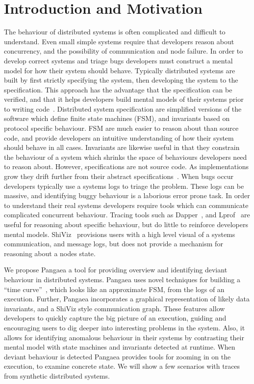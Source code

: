 \section{Introduction and Motivation}
\label{sec:intro}

The behaviour of distributed systems is often complicated and
difficult to understand. Even small simple systems require that
developers reason about concurrency, and the possibility of
communication and node failure. In order to develop correct systems
and triage bugs developers must construct a mental model for how
their system should behave. Typically distributed systems are built by
first strictly specifying the system, then developing the system to the
specification. This approach has the advantage that the specification
can be verified, and that it helps developers build mental models of
their systems prior to writing
code~\cite{Newcombe:2015:AWS:2749359.2699417,WilcoxWPTWEA2015}.
Distributed system specification are simplified versions of the
software which define finite state machines (FSM), and invariants
based on protocol specific behaviour. FSM are much easier to reason
about than source code, and provide developers an intuitive
understanding of how their system should behave in all cases.
Invariants are likewise useful in that they constrain the behaviour of
a system which shrinks the space of behaviours developers need to
reason about. However, specifications are not source code. As
implementations grow they drift further from their abstract
specifications~\cite{917525}. When bugs occur developers typically use
a systems logs to triage the problem. These logs can be massive, and
identifying buggy behaviour is a laborious error prone task.  In order
to understand their real systems developers require tools which can
communicate complicated concurrent behaviour. Tracing tools such as
Dapper~\cite{36356}, and Lprof~\cite{Zhao:2014:LNR:2685048.2685099}
are useful for reasoning about specific behaviour, but do little to
reinforce developers mental models. ShiViz~\cite{BeschastnikhWBE2016}
provisions users with a high level visual of a systems communication,
and message logs, but does not provide a mechanism for reasoning about
a nodes state. 

We propose Pangaea a tool for providing overview and identifying deviant
behaviour in distributed systems. Pangaea uses novel techniques for
building a ``time curve''~\cite{Bach2015timecurves}, 
which looks like an approximate FSM, from the logs of an execution.
Further, Pangaea incorporates a graphical representation of likely
data invariants, and a ShiViz style communication graph. 
These features allow developers to quickly 
capture the big picture of an
execution, guiding and encouraging users to dig deeper into 
interesting problems in the system.
Also, it allows for identifying anomalous behaviour in
their systems by contrasting their mental model with state machines
and invariants detected at runtime. When deviant behaviour is detected
Pangaea provides tools for zooming in on the execution, to examine
concrete state.  We will show a few scenarios with traces from
synthetic distributed systems.

